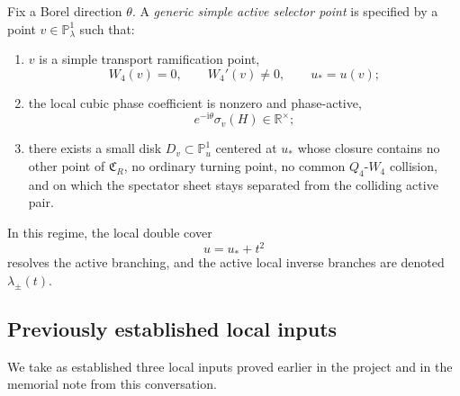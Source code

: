 \documentclass[11pt]{article}
\numberwithin{equation}{section}
\theoremstyle{definition}
\newcommand{\PP}{\mathbb P}
\newcommand{\ii}{\mathrm i}
\newcommand{\CR}{\mathfrak C_R}
\begin{document}
Fix a Borel direction $\theta$. A \emph{generic simple active selector point} is specified by a point $v\in\PP^1_\lambda$ such that:
\begin{enumerate}
  \item $v$ is a simple transport ramification point,
  \begin{equation}
  \label{eq:simple-ramif}
  W_4(v)=0,
  \qquad
  W_4'(v)\neq 0,
  \qquad
  u_*=u(v);
  \end{equation}
  \item the local cubic phase coefficient is nonzero and phase-active,
  \begin{equation}
  \label{eq:phase-active}
  e^{-\ii\theta}\sigma_v(H)\in \mathbb R^\times;
  \end{equation}
  \item there exists a small disk $D_v\subset\PP^1_u$ centered at $u_*$ whose closure contains no other point of $\CR$, no ordinary turning point, no common $Q_4$-$W_4$ collision, and on which the spectator sheet stays separated from the colliding active pair.
\end{enumerate}

In this regime, the local double cover
\begin{equation}
\label{eq:t-cover}
 u=u_*+t^2
\end{equation}
resolves the active branching, and the active local inverse branches are denoted $\lambda_\pm(t)$.

\subsection{Previously established local inputs}

We take as established three local inputs proved earlier in the project and in the memorial note from this conversation.
\end{document}
